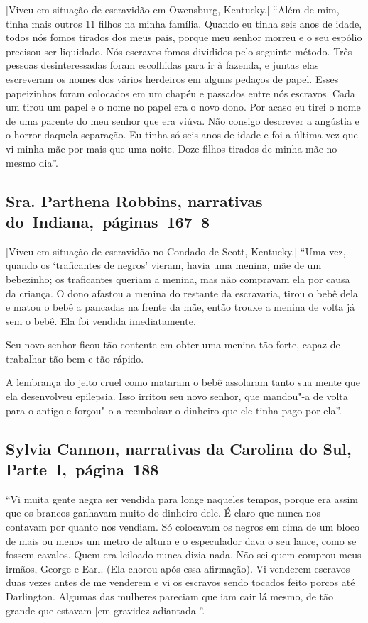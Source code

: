 {[}Viveu em situação de escravidão em Owensburg, Kentucky.{]} ``Além de mim, tinha mais outros 11 filhos na minha família. Quando eu
tinha seis anos de idade, todos nós fomos tirados dos meus pais, porque
meu senhor morreu e o seu espólio precisou ser liquidado. Nós escravos
fomos divididos pelo seguinte método. Três pessoas desinteressadas foram
escolhidas para ir à fazenda, e juntas elas escreveram os nomes dos
vários herdeiros em alguns pedaços de papel. Esses papeizinhos foram
colocados em um chapéu e passados entre nós escravos. Cada um tirou um
papel e o nome no papel era o novo dono. Por acaso eu tirei o nome de
uma parente do meu senhor que era viúva. Não consigo descrever a
angústia e o horror daquela separação. Eu tinha só seis anos de idade e
foi a última vez que vi minha mãe por mais que uma noite. Doze filhos
tirados de minha mãe no mesmo dia''.

\subsection{Sra. Parthena Robbins, narrativas do~Indiana,~páginas~167--8}

{[}Viveu em situação de escravidão no Condado de Scott, Kentucky.{]} ``Uma vez, quando os `traficantes de negros' vieram, havia uma menina,
mãe de um bebezinho; os traficantes queriam a menina, mas não compravam
ela por causa da criança. O dono afastou a menina do restante da
escravaria, tirou o bebê dela e matou o bebê a pancadas na frente da
mãe, então trouxe a menina de volta já sem o bebê. Ela foi vendida
imediatamente.

Seu novo senhor ficou tão contente em obter uma menina tão forte, capaz
de trabalhar tão bem e tão rápido.

A lembrança do jeito cruel como mataram o bebê assolaram tanto sua mente
que ela desenvolveu epilepsia. Isso irritou seu novo senhor, que
mandou"-a de volta para o antigo e forçou"-o a reembolsar o dinheiro que
ele tinha pago por ela''.

\subsection{Sylvia Cannon, narrativas da Carolina do Sul, Parte~I,~página~188} \label{ref46}

``Vi muita gente negra ser vendida para longe naqueles tempos, porque
era assim que os brancos ganhavam muito do dinheiro dele. É claro que
nunca nos contavam por quanto nos vendiam. Só colocavam os negros em
cima de um bloco de mais ou menos um metro de altura e o especulador
dava o seu lance, como se fossem cavalos. Quem era leiloado nunca dizia
nada. Não sei quem comprou meus irmãos, George e Earl. (Ela chorou após
essa afirmação). Vi venderem escravos duas vezes antes de me venderem e
vi os escravos sendo tocados feito porcos até Darlington. Algumas das
mulheres pareciam que iam cair lá mesmo, de tão grande que estavam {[}em
gravidez adiantada{]}''.

